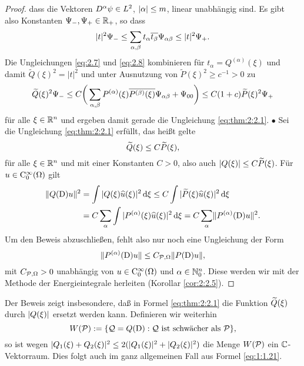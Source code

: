 \begin{proof}
dass die Vektoren $D^\alpha\psi\in L^2$, $\lvert\alpha\rvert\leq m$, linear unabhängig sind.
Es gibt also Konstanten $\Psi_-,\Psi_+\in\mathbb R_+$, so dass
\begin{equation}\label{eq:2.8}
\lvert t\rvert^2\Psi_-\leq\sum_{\alpha,\beta}t_\alpha \overline{t_\beta}\Psi_{\alpha\beta}\leq\lvert t\rvert^2\Psi_+.
\end{equation}
Die Ungleichungen \eqref{eq:2.7} und \eqref{eq:2.8} kombinieren für $t_\alpha=Q^{(\alpha)}(\xi)$ und damit $\widetilde Q(\xi)^2=|t|^2$ 
und unter Ausnutzung von $\widetilde P(\xi)^2\ge c^{-1}>0$ zu
\begin{equation}\label{eq:2.9}
\widetilde{Q}(\xi)^2 \Psi_- \le C  \bigg(\sum_{\alpha,\beta}P^{(\alpha)}(\xi)\overline{{P}^{(\beta)}(\xi)}\Psi_{\alpha\beta}+\Psi_{00}\bigg) \leq  C(1+c) \widetilde{P}(\xi)^2 \Psi_+
\end{equation}
für alle $\xi\in\mathbb R^n$ und ergeben damit gerade die Ungleichung \eqref{eq:thm:2:2.1}.
%
$\bullet$
Sei die Ungleichung \eqref{eq:thm:2:2.1} erfüllt, das heißt gelte
\begin{equation}\label{eq:2.10}
\widetilde{Q}(\xi)\leq C\widetilde{P}(\xi),
\end{equation}
für alle $\xi\in\mathbb R^n$ und mit einer Konstanten $C>0$,
also auch $\lvert Q(\xi)\rvert\leq C\widetilde{P}(\xi)$.
Für $u\in\mathrm C_0^\infty(\Omega)$ gilt
\begin{align}
\|Q(\mathrm D) u\|^2 &= \int |Q(\xi) \widehat{u}(\xi)|^2 \,\mathrm d\xi
\leq C \int |\widetilde P(\xi) \widehat{u}(\xi)|^2 \,\mathrm d\xi \notag\\&  = C\sum_\alpha\int | P^{(\alpha)}(\xi)\widehat{u}(\xi)|^2\,\mathrm d\xi = C\sum_\alpha\lVert P^{(\alpha)}(\mathrm D)u\rVert^2.\label{eq:2.11}
\end{align}
Um den Beweis abzuschließen,
fehlt also nur noch eine Ungleichung der Form
\begin{equation}
\lVert P^{(\alpha)}(\mathrm D)u\rVert\leq C_{\mathcal P,\Omega}\lVert P(\mathrm D)u\rVert, \label{eq:2:wantedineq}
\end{equation}
mit $C_{\mathcal P,\Omega}>0$ unabhängig von $u\in\mathrm C_0^\infty(\Omega)$ und $\alpha\in\mathbb N_0^n$. Diese werden wir mit der Methode der Energieintegrale herleiten (Korollar \ref{cor:2:2.5}).
\end{proof}

\begin{rem}
Der Beweis zeigt insbesondere, daß in Formel \eqref{eq:thm:2:2.1} die Funktion $\widetilde{Q}(\xi)$ durch $|Q(\xi)|$ ersetzt werden kann.
Definieren wir weiterhin
\begin{equation}
W(\mathcal P):=\{\mathcal Q=Q(\mathrm D):\mathcal Q~\text{ist schwächer als}~\mathcal P\},
\end{equation}
so ist wegen $|Q_1(\xi)+Q_2(\xi)|^2\leq2(|Q_1(\xi)|^2+|Q_2(\xi)|^2)$
die Menge $W(\mathcal P)$ ein $\mathbb C$-Vektorraum.
Dies folgt auch im ganz allgemeinen Fall aus Formel \eqref{eq:1:1.21}.
\end{rem}

